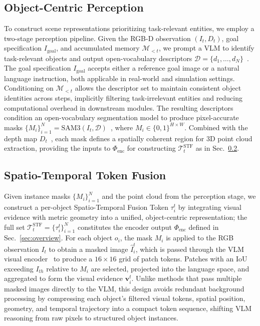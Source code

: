 \subsection{Object-Centric Perception}
\label{sec:perception}
To construct scene representations prioritizing task-relevant entities, we employ a two-stage perception pipeline. Given the RGB-D observation $(I_t, D_t)$, goal specification $I_{\text{goal}}$, and accumulated memory $\mathcal{M}_{<t}$, we prompt a VLM to identify task-relevant objects and output open-vocabulary descriptors $\mathcal{D}=\{d_1,\ldots,d_N\}$~\cite{qisofar, zhouroborefer}. The goal specification $I_{\text{goal}}$ accepts either a reference goal image or a natural language instruction, both applicable in real-world and simulation settings. Conditioning on $\mathcal{M}_{<t}$ allows the descriptor set to maintain consistent object identities across steps, implicitly filtering task-irrelevant entities and reducing computational overhead in downstream modules. The resulting descriptors condition an open-vocabulary segmentation model to produce pixel-accurate masks $\{M_i\}_{i=1}^{N}=\mathrm{SAM3}(I_t,\mathcal{D})$~\cite{carion2025sam}, where $M_i\in\{0,1\}^{H\times W}$. Combined with the depth map $D_t$~\cite{depthanything}, each mask defines a spatially coherent region for 3D point cloud extraction, providing the inputs to $\Phi_{\text{enc}}$ for constructing $\mathcal{T}_t^{\text{STF}}$ as in Sec.~\ref{sec:stf}.


\subsection{Spatio-Temporal Token Fusion}
\label{sec:stf}

Given instance masks $\{M_i\}_{i=1}^{N}$ and the point cloud from the perception stage, we construct a per-object Spatio-Temporal Fusion Token $\tau_i^t$ by integrating visual evidence with metric geometry into a unified, object-centric representation; the full set $\mathcal{T}_t^{\text{STF}} = \{\tau_i^t\}_{i=1}^{N}$ constitutes the encoder output $\Phi_{\text{enc}}$ defined in Sec.~\ref{sec:overview}. For each object $o_i$, the mask $M_i$ is applied to the RGB observation $I_t$ to obtain a masked image $\hat{I}_i^t$, which is passed through the VLM visual encoder~\cite{radford2021learning, dosovitskiy2020image} to produce a $16 \times 16$ grid of patch tokens. Patches with an IoU exceeding $I_{th}$ relative to $M_i$ are selected, projected into the language space, and aggregated to form the visual evidence $\mathbf{v}_i^t$. Unlike methods that pass multiple masked images directly to the VLM, this design avoids redundant background processing by compressing each object's filtered visual tokens, spatial position, geometry, and temporal trajectory into a compact token sequence, shifting VLM reasoning from raw pixels to structured object instances.

